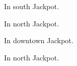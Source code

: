 

\begin{LocationList}

\Location{\GasStation \Gas}
In south Jackpot.

In north Jackpot.

In downtown Jackpot.

In north Jackpot.

\end{LocationList}
